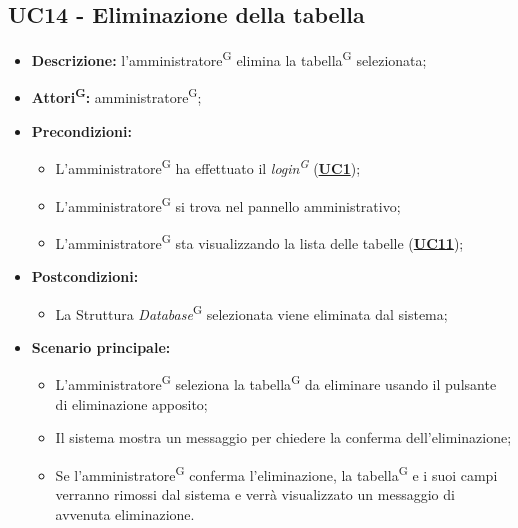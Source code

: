 \subsection{UC14 - Eliminazione della tabella}
\label{sec:UC14}
\begin{itemize}
	\item \textbf{Descrizione:} l’amministratore\textsuperscript{G} elimina la tabella\textsuperscript{G} selezionata;
	\item \textbf{Attori\textsuperscript{G}:} amministratore\textsuperscript{G};
	\item \textbf{Precondizioni:} 
	\begin{itemize}
		\item L’amministratore\textsuperscript{G} ha effettuato il \textit{login\textsuperscript{G}} (\hyperref[sec:UC1]{\textbf{UC1}});
		\item L’amministratore\textsuperscript{G} si trova nel pannello amministrativo;
		\item L’amministratore\textsuperscript{G} sta visualizzando la lista delle tabelle (\hyperref[sec:UC11]{\textbf{UC11}});
	\end{itemize}
	\item \textbf{Postcondizioni:} 
	\begin{itemize}
		\item La Struttura \textit{Database}\textsuperscript{G} selezionata viene eliminata dal sistema;
	\end{itemize}
	\item \textbf{Scenario principale:} 
	\begin{itemize}
		\item L'amministratore\textsuperscript{G} seleziona la tabella\textsuperscript{G} da eliminare usando il pulsante di eliminazione apposito;
		\item Il sistema mostra un messaggio per chiedere la conferma dell'eliminazione;
		\item Se l'amministratore\textsuperscript{G} conferma l'eliminazione, la tabella\textsuperscript{G} e i suoi campi verranno rimossi dal sistema e verrà visualizzato un messaggio di avvenuta eliminazione.
	\end{itemize}
\end{itemize}

